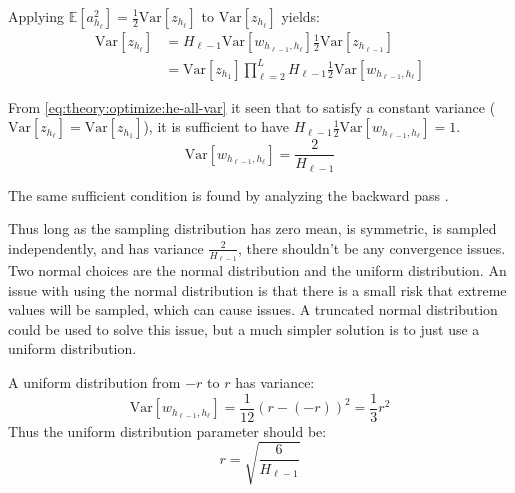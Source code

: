 Applying $\mathbb{E}[a_{h_\ell}^2] = \frac{1}{2} \mathrm{Var}[z_{h_\ell}]$ to $\mathrm{Var}[z_{h_\ell}]$  yields:
\begin{equation}
\begin{aligned}
\mathrm{Var}[z_{h_\ell}] &= H_{\ell-1} \mathrm{Var}[w_{h_{\ell-1}, h_{\ell}}] \frac{1}{2} \mathrm{Var}[z_{h_{\ell-1}}] \\
&= \mathrm{Var}[z_{h_1}] \prod_{\ell=2}^L H_{\ell-1} \frac{1}{2} \mathrm{Var}[w_{h_{\ell-1}, h_{\ell}}]
\end{aligned}
\label{eq:theory:optimize:he-all-var}
\end{equation}

From \eqref{eq:theory:optimize:he-all-var} it seen that to satisfy a constant variance ($\mathrm{Var}[z_{h_\ell}] = \mathrm{Var}[z_{h_1}]$), it is sufficient to have ${H_{\ell-1} \frac{1}{2} \mathrm{Var}[w_{h_{\ell-1}, h_{\ell}}] = 1}$.
\begin{equation}
\mathrm{Var}[w_{h_{\ell-1}, h_{\ell}}] = \frac{2}{H_{\ell-1}}
\end{equation}

The same sufficient condition is found by analyzing the backward pass \cite{he-initialization}.

Thus long as the sampling distribution has zero mean, is symmetric, is sampled independently, and has variance $\frac{2}{H_{\ell-1}}$, there shouldn't be any convergence issues. Two normal choices are the normal distribution and the uniform distribution. An issue with using the normal distribution is that there is a small risk that extreme values will be sampled, which can cause issues. A truncated normal distribution could be used to solve this issue, but a much simpler solution is to just use a uniform distribution.

A uniform distribution from $-r$ to $r$ has variance:
\begin{equation}
\mathrm{Var}[w_{h_{\ell-1}, h_{\ell}}] = \frac{1}{12} (r - (-r))^2 = \frac{1}{3} r^2
\end{equation}
Thus the uniform distribution parameter should be:
\begin{equation}
r = \sqrt{\frac{6}{H_{\ell-1}}}
\end{equation}

